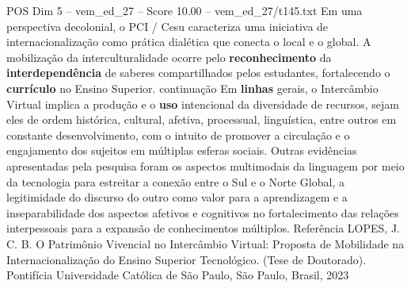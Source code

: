 \begin{textsample}{POS Dim 5 – vem\_ed\_27 – Score 10.00 – vem\_ed\_27/t145.txt}
Em uma perspectiva decolonial, o PCI / Cesu caracteriza uma iniciativa de internacionalização como prática dialética que conecta o local e o global.
A mobilização da interculturalidade ocorre pelo \textbf{reconhecimento} da \textbf{interdependência} de saberes compartilhados pelos estudantes, fortalecendo o \textbf{currículo} no Ensino Superior. continuação Em \textbf{linhas} gerais, o Intercâmbio Virtual implica a produção e o \textbf{uso} intencional da diversidade de recursos, sejam eles de ordem histórica, cultural, afetiva, processual, linguística, entre outros em constante desenvolvimento, com o intuito de promover a circulação e o engajamento dos sujeitos em múltiplas esferas sociais.
Outras evidências apresentadas pela pesquisa foram os aspectos multimodais da linguagem por meio da tecnologia para estreitar a conexão entre o Sul e o Norte Global, a legitimidade do discurso do outro como valor para a aprendizagem e a inseparabilidade dos aspectos afetivos e cognitivos no fortalecimento das relações interpessoais para a expansão de conhecimentos múltiplos.
Referência LOPES, J.
C.
B.
O Patrimônio Vivencial no Intercâmbio Virtual: Proposta de Mobilidade na Internacionalização do Ensino Superior Tecnológico. (Tese de Doutorado).
Pontifícia Universidade Católica de São Paulo, São Paulo, Brasil, 2023

\end{textsample}
